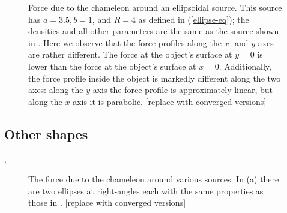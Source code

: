 \documentclass[a4paper, 12pt]{article}
\numberwithin{equation}{section}
\newcommand{\note}[1]{{\color{blue}[#1]}}
\begin{document}
\begin{figure}[!t]
\begin{center}
      \end{center}
\caption{ Force due to the chameleon around an ellipsoidal source. This source  has $a = 3.5, b = 1$, and $R=4$ as defined in (\ref{ellipse-eq}); the densities and all other parameters are the same as the source shown in . Here we observe that the force profiles along the $x$- and $y$-axes are rather different. The force at the object's surface at $y=0$ is lower than the force at the object's surface at $x=0$. Additionally, the force profile inside the object is markedly different along the two axes: along the $y$-axis the force profile is approximately linear, but along the $x$-axis it is parabolic. \note{replace with converged versions} }\label{fig:ellip}
\end{figure}

\subsection{Other shapes}
.

\begin{figure}[!t]
      \begin{center}
      \end{center}
\caption{ The force due to the chameleon around various sources. In (a) there are two ellipses at right-angles each with the same properties as those in .  \note{replace with converged versions}}\label{fig:varioushapes}
\end{figure}
\end{document}
